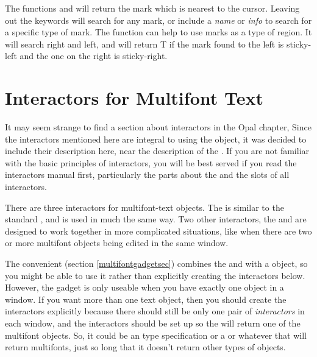 The functions  and
 will return the mark which is nearest to the
cursor.  Leaving out the keywords will search for any mark, or include a
{\it name} or {\it info} to search for a specific type of mark.
The function  can help to use marks as a type of region.
It will search right and left, and  will return T if the mark found to the
left is sticky-left and the one on the right is sticky-right.


\section{Interactors for Multifont Text}
\label{multifontinters}

It may seem strange to find a section about interactors in the Opal chapter,
Since the interactors mentioned here are integral to using the
 object, it was decided to include their description
here, near the description of the .  If you are not
familiar with the basic principles of interactors, you will be best served
if you read the interactors manual first, particularly the parts about the
 and the slots of all interactors.

There are three interactors for multifont-text objects.  The
 is similar to the standard
, and is used in much the same way.  Two other
interactors, the  and
 are designed to work together in more
complicated situations, like when there are two or more multifont
objects being edited in the same window.

The convenient  (section \ref{multifontgadgetsec})
combines the  and 
with a  object, so you might be able to use it rather
than explicitly creating the interactors below.   However, the gadget
is only useable when you have exactly one  object in
a window.  If you want more than one text object, then you should
create the interactors explicitly because there should still be only
one pair of {\it interactors} in each window, and the interactors should
be set up so the  will return one of the multifont
objects.  So, it could be an  type
specification or a  or whatever that will return
multifonts, just so long that it doesn't return other types of objects.

